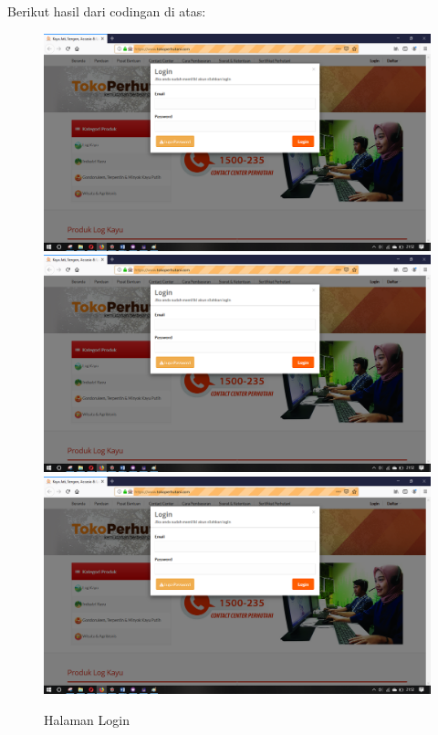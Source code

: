 Berikut hasil dari codingan di atas:
\begin{figure}[h]
	\centering
	\includegraphics[scale=0.20]{figures/0login}
	\includegraphics[scale=0.28]{figures/0login}
	\includegraphics[scale=0.20]{figures/0login}
	\caption{Halaman Login}
\end{figure}

